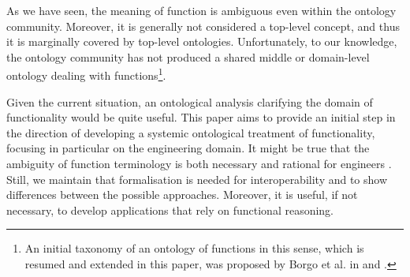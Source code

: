 \documentclass[sw]{iosart2x}
\newcommand{\TODO}[1]{{%
}}
\begin{document}


As we have seen, 
the meaning of function is ambiguous even within the ontology community. 
Moreover, it is generally not considered a top-level concept, and thus it is marginally covered by top-level ontologies. 
Unfortunately, to our knowledge, the ontology community has not produced a shared middle or domain-level ontology dealing with functions\footnote{An initial taxonomy of an ontology of functions in this sense, which is resumed and extended in this paper, was proposed by Borgo et al. in \cite{borgoCapabilitiesCapacitiesFunctionalities2021} and \cite{borgoKnowledgebasedAdaptiveAgents2019}.}. 

Given the current situation, an ontological analysis clarifying the domain of functionality would be quite useful.
This paper aims to provide an initial step in the direction of developing a systemic ontological treatment of functionality, focusing in particular on the engineering domain.
It might be true that the ambiguity of function terminology is both necessary and rational for engineers \cite{vermaasConceptualElusivenessEngineering2012}. 
Still, we maintain that formalisation is needed for interoperability and to show differences between the possible approaches. Moreover, it is useful, if not necessary, to develop applications that rely on functional reasoning.
\end{document}
